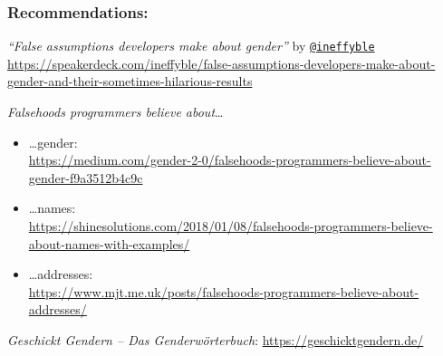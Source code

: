\documentclass[aspectratio=169,x11names]{beamer}
\begin{document}
\begin{frame}
\frametitle{Recommendations:}
\small

\emph{``False assumptions developers make about gender''} by \href{https://twitter.com/ineffyble}{\texttt{@ineffyble}}\\
\scriptsize
\url{https://speakerdeck.com/ineffyble/false-assumptions-developers-make-about-gender-and-their-sometimes-hilarious-results}
\small\bigskip

\emph{Falsehoods programmers believe about}\dots
\begin{itemize}
\scriptsize
\item\dots gender:\\ \url{https://medium.com/gender-2-0/falsehoods-programmers-believe-about-gender-f9a3512b4c9c}
\item\dots names:\\ \url{https://shinesolutions.com/2018/01/08/falsehoods-programmers-believe-about-names-with-examples/}
\item\dots addresses:\\ \url{https://www.mjt.me.uk/posts/falsehoods-programmers-believe-about-addresses/}
\end{itemize}

\small
\emph{Geschickt Gendern -- Das Genderwörterbuch}: \url{https://geschicktgendern.de/}
\end{frame}

\end{document}

